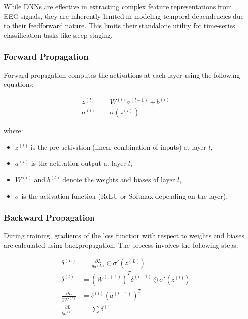 While DNNs are effective in extracting complex feature representations from EEG signals, they are inherently limited in modeling temporal dependencies due to their feedforward nature. This limits their standalone utility for time-series classification tasks like sleep staging.

\subsubsection{Forward Propagation}

Forward propagation computes the activations at each layer using the following equations:

\begin{align}
	z^{(l)} &= W^{(l)} a^{(l-1)} + b^{(l)} \\
	a^{(l)} &= \sigma(z^{(l)})
\end{align}

\noindent where:
\begin{itemize}
	\item \( z^{(l)} \) is the pre-activation (linear combination of inputs) at layer \( l \),
	\item \( a^{(l)} \) is the activation output at layer \( l \),
	\item \( W^{(l)} \) and \( b^{(l)} \) denote the weights and biases of layer \( l \),
	\item \( \sigma \) is the activation function (ReLU or Softmax depending on the layer).
\end{itemize}

\subsubsection{Backward Propagation}

During training, gradients of the loss function with respect to weights and biases are calculated using backpropagation. The process involves the following steps:

\begin{align}
	\delta^{(L)} &= \frac{\partial L}{\partial a^{(L)}} \odot \sigma'(z^{(L)}) \\
	\delta^{(l)} &= \left(W^{(l+1)}\right)^T \delta^{(l+1)} \odot \sigma'(z^{(l)}) \\
	\frac{\partial L}{\partial W^{(l)}} &= \delta^{(l)} \left(a^{(l-1)}\right)^T \\
	\frac{\partial L}{\partial b^{(l)}} &= \sum \delta^{(l)}
\end{align}


